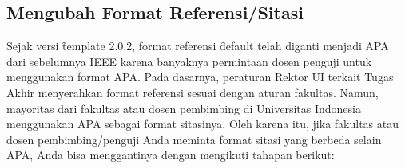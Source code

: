 \subsection{Mengubah Format Referensi/Sitasi}
\label{sec:bibtexChangeFormat}
Sejak versi \f{template} 2.0.2, format referensi \f{default} telah diganti menjadi APA dari sebelumnya IEEE karena banyaknya permintaan dosen penguji untuk menggunakan format APA.
Pada dasarnya, peraturan Rektor UI terkait Tugas Akhir menyerahkan format referensi sesuai dengan aturan fakultas.
Namun, mayoritas dari fakultas atau dosen pembimbing di Universitas Indonesia menggunakan APA sebagai format sitasinya.
Oleh karena itu, jika fakultas atau dosen pembimbing/penguji Anda meminta format sitasi yang berbeda selain APA, Anda bisa menggantinya dengan mengikuti tahapan berikut:
